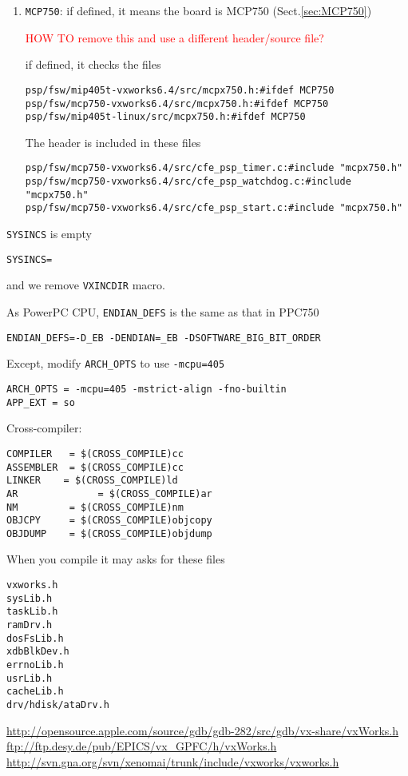 \begin{enumerate}
    \item \verb!MCP750!: if defined, it means the board is MCP750
  (Sect.\ref{sec:MCP750})
  
  \textcolor{red}{HOW TO remove this and use a different header/source file?}
  
  if defined, it checks the files
\begin{verbatim}
psp/fsw/mip405t-vxworks6.4/src/mcpx750.h:#ifdef MCP750
psp/fsw/mcp750-vxworks6.4/src/mcpx750.h:#ifdef MCP750
psp/fsw/mip405t-linux/src/mcpx750.h:#ifdef MCP750
\end{verbatim}
The header is included in these files
\begin{verbatim}
psp/fsw/mcp750-vxworks6.4/src/cfe_psp_timer.c:#include "mcpx750.h"
psp/fsw/mcp750-vxworks6.4/src/cfe_psp_watchdog.c:#include "mcpx750.h"
psp/fsw/mcp750-vxworks6.4/src/cfe_psp_start.c:#include "mcpx750.h"
\end{verbatim}
  
  
\end{enumerate}

\verb!SYSINCS! is empty
\begin{verbatim}
SYSINCS=
\end{verbatim}
and we remove \verb!VXINCDIR! macro.

As PowerPC CPU, \verb!ENDIAN_DEFS! is the same as that in PPC750
\begin{verbatim}
ENDIAN_DEFS=-D_EB -DENDIAN=_EB -DSOFTWARE_BIG_BIT_ORDER
\end{verbatim}
Except, modify \verb!ARCH_OPTS! to use \verb!-mcpu=405!
\begin{verbatim}
ARCH_OPTS = -mcpu=405 -mstrict-align -fno-builtin
APP_EXT = so
\end{verbatim}



Cross-compiler:
\begin{verbatim}
COMPILER   = $(CROSS_COMPILE)cc
ASSEMBLER  = $(CROSS_COMPILE)cc
LINKER    = $(CROSS_COMPILE)ld
AR              = $(CROSS_COMPILE)ar
NM         = $(CROSS_COMPILE)nm
OBJCPY     = $(CROSS_COMPILE)objcopy
OBJDUMP    = $(CROSS_COMPILE)objdump
\end{verbatim}


When you compile it may asks for these files
\begin{verbatim}
vxworks.h
sysLib.h
taskLib.h
ramDrv.h
dosFsLib.h
xdbBlkDev.h
errnoLib.h
usrLib.h
cacheLib.h
drv/hdisk/ataDrv.h
\end{verbatim}
\url{http://opensource.apple.com/source/gdb/gdb-282/src/gdb/vx-share/vxWorks.h}
\url{ftp://ftp.desy.de/pub/EPICS/vx_GPFC/h/vxWorks.h}
\url{http://svn.gna.org/svn/xenomai/trunk/include/vxworks/vxworks.h}

